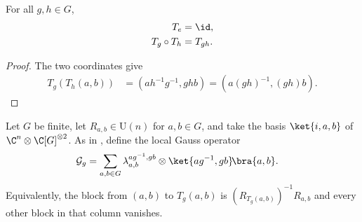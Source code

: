 \begin{lemma}
    \label{thm:mpug_gauss_leg_action_mul}
    \leanok
    For all $g,h\in G$,
    \begin{align}
        T_e          & =\id,    \\
        T_g\circ T_h & =T_{gh}.
        \label{eq:mpug_gauss_leg_action_mul}
    \end{align}
\end{lemma}

\begin{proof}\leanok
    The two coordinates give
    \begin{align}
        T_g(T_h(a,b))
         & =\left(ah^{-1}g^{-1},ghb\right)
        =\left(a(gh)^{-1},(gh)b\right).
    \end{align}
\end{proof}

\begin{definition}
    \label{def:mpug_gauss_operator}
    \leanok
    Let $G$ be finite, let $R_{a,b}\in\mathrm U(n)$ for $a,b\in G$, and take
    the basis $\ket{i,a,b}$ of $\C^n\otimes\C[G]^{\otimes2}$. As in
    \cite[lines~3380--3387]{FrancoRubio2025MPUGauging}, define the local Gauss
    operator
    \begin{align}
        \mathcal G_g
         & =\sum_{a,b\in G}
        \lambda_{a,b}^{ag^{-1},gb}
        \otimes\ket{ag^{-1},gb}\!\bra{a,b}.
        \label{eq:mpug_gauss_operator}
    \end{align}
    Equivalently, the block from $(a,b)$ to $T_g(a,b)$ is
    $(R_{T_g(a,b)})^{-1}R_{a,b}$ and every other block in that column
    vanishes.
\end{definition}

